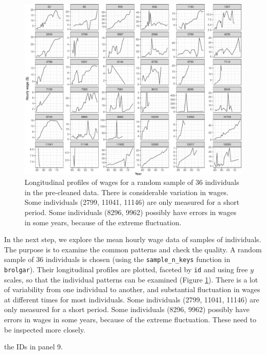 \documentclass{article}
\begin{document}
\begin{figure}

{\centering \includegraphics[width=1\linewidth]{figures/sample-plot-1} 

}

\caption{Longitudinal profiles of wages for a random sample of 36 individuals in the pre-cleaned data. There is considerable variation in wages. Some individuals  (2799, 11041, 11146) are only measured for a short period. Some individuals (8296, 9962) possibly have errors in wages in some years, because of the extreme fluctuation.}\label{fig:sample-plot}
\end{figure}

In the next step, we explore the mean hourly wage data of samples of individuals. The purpose is to examine the common patterns and check the quality. A random sample of 36 individuals is chosen (using the \texttt{sample\_n\_keys} function in \texttt{brolgar}). Their longitudinal profiles are plotted, faceted by \texttt{id} and using free \(y\) scales, so that the individual patterns can be examined (Figure \ref{fig:sample-plot}). There is a lot of variability from one individual to another, and substantial fluctuation in wages at different times for most individuals. Some individuals (2799, 11041, 11146) are only measured for a short period. Some individuals (8296, 9962) possibly have errors in wages in some years, because of the extreme fluctuation. These need to be inspected more closely.

the IDs in panel 9.
\end{document}
